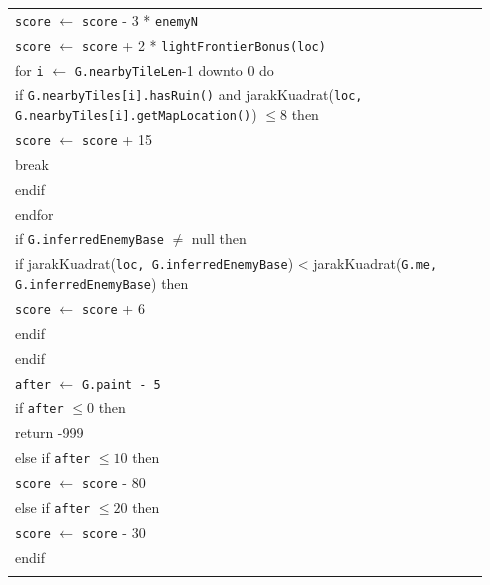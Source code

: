 \documentclass{article}
\newenvironment{pseudobox}
{
\centering
\begin{longtable}{|p{0.94\linewidth}|}
\hline
}
{
\\ \hline
\end{longtable}
\vspace{0.05cm}
}
\begin{document}
\begin{enumerate}[label=\alph*.]
\begin{enumerate}[label=\alph*.]
\begin{pseudobox}
\hspace*{1.5em}\texttt{score} $\leftarrow$ \texttt{score} - 3 * \texttt{enemyN} \\
\hspace*{1.5em}\texttt{score} $\leftarrow$ \texttt{score} + 2 * \texttt{lightFrontierBonus(loc)} \\

\hspace*{1.5em}for \texttt{i} $\leftarrow$ \texttt{G.nearbyTileLen}-1 downto 0 do \\
\hspace*{3em}if \texttt{G.nearbyTiles[i].hasRuin()} and jarakKuadrat(\texttt{loc, G.nearbyTiles[i].getMapLocation()}) $\leq 8$ then \\
\hspace*{4.5em}\texttt{score} $\leftarrow$ \texttt{score} + 15 \\
\hspace*{4.5em}break \\
\hspace*{3em}endif \\
\hspace*{1.5em}endfor \\

\hspace*{1.5em}if \texttt{G.inferredEnemyBase} $\neq$ null then \\
\hspace*{3em}if jarakKuadrat(\texttt{loc, G.inferredEnemyBase}) < jarakKuadrat(\texttt{G.me, G.inferredEnemyBase}) then \\
\hspace*{4.5em}\texttt{score} $\leftarrow$ \texttt{score} + 6 \\
\hspace*{3em}endif \\
\hspace*{1.5em}endif \\

\hspace*{1.5em}\texttt{after} $\leftarrow$ \texttt{G.paint - 5} \\
\hspace*{1.5em}if \texttt{after} $\leq 0$ then \\
\hspace*{3em}return -999 \\
\hspace*{1.5em}else if \texttt{after} $\leq 10$ then \\
\hspace*{3em}\texttt{score} $\leftarrow$ \texttt{score} - 80 \\
\hspace*{1.5em}else if \texttt{after} $\leq 20$ then \\
\hspace*{3em}\texttt{score} $\leftarrow$ \texttt{score} - 30 \\
\hspace*{1.5em}endif \\


\end{pseudobox}
\end{enumerate}
\end{enumerate}
\end{document}
